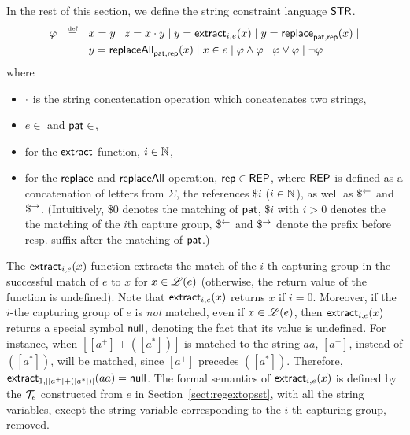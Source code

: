 
In the rest of this section, we define the string constraint language $\mathsf{STR}$.
\[
\begin{array}{l c l}
\smallskip
\varphi & \eqdef  & x = y \mid z = x \concat y \mid y  = \extract_{i, e}(x) \mid
y  = \replace_{\pat, \rep}(x) \mid 
\\
& & y = \replaceall_{\pat, \rep}(x)   \mid
 x \in e \mid  \varphi \wedge \varphi \mid \varphi \vee \varphi \mid \neg \varphi \
\label{eq:SL}
\end{array}
\]
where
\begin{itemize}
	\item $\cdot$ is the string concatenation operation which concatenates two strings,
%
\item  $e \in${\regexp} and $\mathsf{pat} \in${\regexp},
%
\item for the $\mathsf{extract}$ function, $i \in \mathbb{N}$,
%
	\item  for the $\mathsf{replace}$ and $\mathsf{replaceAll}$ operation, $\mathsf{rep} \in {\sf REP}$, where ${\sf REP}$ is defined as a concatenation of letters from $\Sigma$, the references $\$i$ ($i \in \mathbb{N}$), as well as $\$^{\leftarrow}$ and $\$^{\rightarrow}$. (Intuitively, $\$0$ denotes the matching of $\mathsf{pat}$, $\$i$ with $i > 0$ denotes the the matching of the $i$th capture group, $\$^{\leftarrow}$ and $\$^{\rightarrow}$ denote the prefix before resp. suffix after the matching of $\mathsf{pat}$.)
%
\end{itemize}

The $\mathsf{extract}_{i, e}(x)$ function extracts the match of the $i$-th capturing group in the successful match of $e$ to $x$ for $x \in \mathscr{L}(e)$ (otherwise, the return value of the function is undefined). Note that $\mathsf{extract}_{i, e}(x)$ returns $x$ if $i=0$. Moreover, if the $i$-the capturing group of $e$ is \emph{not} matched, even if $x \in \mathscr{L}(e)$, then $\mathsf{extract}_{i, e}(x)$ returns a special symbol $\mathsf{null}$, denoting the fact that its value is undefined. For instance, when $[[a^+] + ([a^*])]$ is matched to the string $aa$, $[a^+]$, instead of $([a^*])$, will be matched, since $[a^+]$ precedes $([a^*])$. Therefore, $\mathsf{extract}_{1, [[a^+] + ([a^*])]}(aa) = \mathsf{null}$. 
The formal semantics of $\mathsf{extract}_{i, e}(x)$ is defined by the {\PSST} $\mathcal{T}_e$ constructed from $e$ in Section~\ref{sect:regextopsst}, with all the string variables, except the string variable corresponding to the $i$-th capturing group, removed.
%


